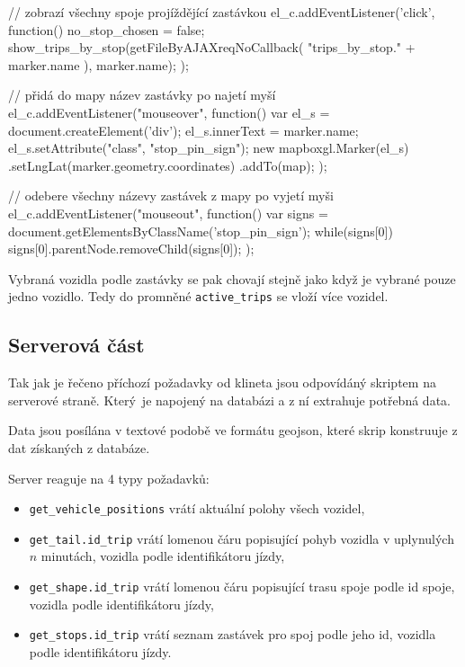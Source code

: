 \begin{code}[frame=none]
// zobrazí všechny spoje projíždějící zastávkou
el_c.addEventListener('click', function() {
  no_stop_chosen = false;
  show_trips_by_stop(getFileByAJAXreqNoCallback(
    "trips_by_stop." + marker.name
  ), marker.name);
});

// přidá do mapy název zastávky po najetí myší
el_c.addEventListener("mouseover", function(){
  var el_s = document.createElement('div');
  el_s.innerText = marker.name;
  el_s.setAttribute("class", "stop_pin_sign");
  new mapboxgl.Marker(el_s)
    .setLngLat(marker.geometry.coordinates)
    .addTo(map);
});

// odebere všechny názevy zastávek z mapy po vyjetí myši
el_c.addEventListener("mouseout", function(){
  var signs = document.getElementsByClassName('stop_pin_sign');
  while(signs[0]) {
    signs[0].parentNode.removeChild(signs[0]);
  }
});
\end{code}

Vybraná vozidla podle zastávky se pak chovají stejně jako když je vybrané pouze jedno vozidlo. Tedy do promněné \verb-active_trips- se vloží více vozidel.

\subsection{Serverová část}

Tak jak je řečeno příchozí požadavky od klineta jsou odpovídáný skriptem na serverové straně. Který je napojený na databázi a z ní extrahuje potřebná data.

\bigbreak

Data jsou posílána v textové podobě ve formátu \gls{geojson}, které skrip konstruuje z dat získaných z databáze.

\bigbreak

Server reaguje na 4 typy požadavků:

\begin{itemize}
	\item \verb-get_vehicle_positions- vrátí aktuální polohy všech vozidel,

	\item \verb-get_tail.id_trip- vrátí lomenou čáru popisující pohyb vozidla v uplynulých $n$ minutách, vozidla podle identifikátoru jízdy,

	\item \verb-get_shape.id_trip- vrátí lomenou čáru popisující trasu spoje podle id spoje, vozidla podle identifikátoru jízdy,

	\item \verb-get_stops.id_trip- vrátí seznam zastávek pro spoj podle jeho id, vozidla podle identifikátoru jízdy.
\end{itemize}


